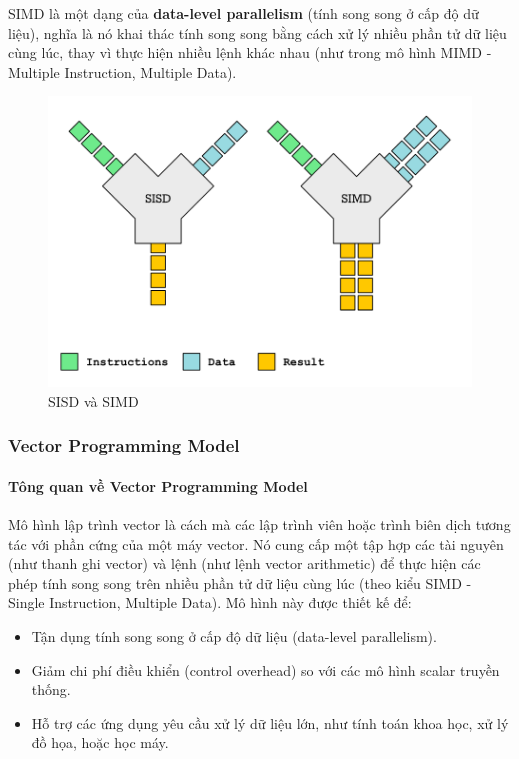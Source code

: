 \documentclass[a4paper]{article}
\begin{document}

SIMD là một dạng của \textbf{data-level parallelism} (tính song song ở cấp độ dữ liệu), nghĩa là nó khai thác tính song song bằng cách xử lý nhiều phần tử dữ liệu cùng lúc, thay vì thực hiện nhiều lệnh khác nhau (như trong mô hình MIMD - Multiple Instruction, Multiple Data).
\begin{figure}[H]
     \centering
     \includegraphics[scale =0.4]{assets/simd.png}
     \caption{SISD và SIMD}
     \label{fig:2ss}
 \end{figure}
 
\subsubsection{Vector Programming Model}
\paragraph{Tông quan về Vector Programming Model}

Mô hình lập trình vector là cách mà các lập trình viên hoặc trình biên dịch tương tác với phần cứng của một máy vector. Nó cung cấp một tập hợp các tài nguyên (như thanh ghi vector) và lệnh (như lệnh vector arithmetic) để thực hiện các phép tính song song trên nhiều phần tử dữ liệu cùng lúc (theo kiểu SIMD - Single Instruction, Multiple Data). Mô hình này được thiết kế để:

\begin{itemize}
\item Tận dụng tính song song ở cấp độ dữ liệu (data-level parallelism).
\item Giảm chi phí điều khiển (control overhead) so với các mô hình scalar truyền thống.
\item Hỗ trợ các ứng dụng yêu cầu xử lý dữ liệu lớn, như tính toán khoa học, xử lý đồ họa, hoặc học máy.
\end{itemize}
\end{document}
